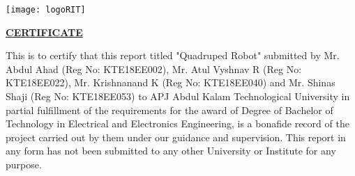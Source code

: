 \begin{center}

\begin{center}   
    \texttt{[image: logoRIT]}
\end{center}
\vspace{0.5cm}


\vspace{2 cm}

\textbf{\underline{CERTIFICATE}}\\
\vspace{0.5cm}
\end{center}

This is to certify that this report titled "Quadruped Robot" submitted by Mr. Abdul Ahad (Reg No: KTE18EE002), Mr. Atul Vyshnav R (Reg No: KTE18EE022), Mr. Krishnanand K (Reg No: KTE18EE040) and Mr. Shinas Shaji (Reg No: KTE18EE053) to APJ Abdul Kalam Technological University in partial fulfillment of the requirements for the award of Degree of Bachelor of Technology in Electrical and Electronics Engineering, is a bonafide record of the project carried out by them under our guidance and supervision. This report in any form has not been submitted to any other University or Institute for any purpose. 